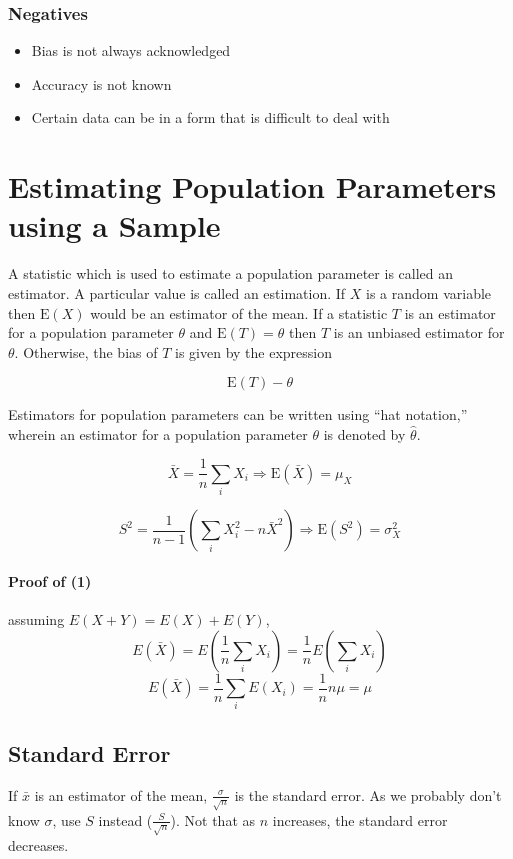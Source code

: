\documentclass{article}
\begin{document}
\subsubsection{Negatives}

\begin{itemize}

    \item Bias is not always acknowledged 
    \item Accuracy is not known 
    \item Certain data can be in a form that is difficult to deal with

\end{itemize}

\section{Estimating Population Parameters using a Sample}

A statistic which is used to estimate a population parameter is called an
estimator. A particular value is called an estimation. If $X$ is a random
variable then $\textrm{E}(X)$ would be an estimator of the mean. If a statistic
$T$ is an estimator for a population parameter $\theta$ and
$\textrm{E}(T)=\theta$ then $T$ is an unbiased estimator for $\theta$.
Otherwise, the bias of $T$ is given by the expression

\[\textrm{E}(T)-\theta\]

\noindent Estimators for population parameters can be written using ``hat
notation,'' wherein an estimator for a population parameter $\theta$ is denoted
by $\hat{\theta}$.

\begin{equation}\bar{X}=\frac{1}{n}\sum_iX_i\Rightarrow
\textrm{E}(\bar{X})=\mu_X\end{equation}

\begin{equation}S^2=\frac{1}{n-1}\left(\sum_iX_i^2-n\bar{X}^2\right)\Rightarrow
\textrm{E}(S^2)=\sigma_X^2\end{equation}

\paragraph{Proof of (1)} assuming $E(X+Y)=E(X)+E(Y)$,
\[E(\bar{X})=E\left(\frac{1}{n}\sum_iX_i\right)=\frac{1}{n}E\left(\sum_iX_i\right)\]
\[E(\bar{X})=\frac{1}{n}\sum_iE(X_i)=\frac{1}{n}n\mu=\mu\]

\subsection{Standard Error}

If $\bar{x}$ is an estimator of the mean, $\frac{\sigma}{\sqrt n}$ is the
standard error. As we probably don't know $\sigma$, use $S$ instead
($\frac{S}{\sqrt n}$). Not that as $n$ increases, the standard error decreases.
\end{document}
